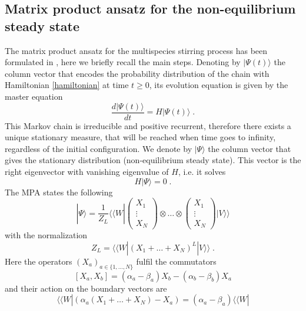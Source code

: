 \documentclass[10pt]{article}
\numberwithin{equation}{section}
\numberwithin{equation}{subsection}
\newcommand{\co}{\;,}
\newcommand{\dt}{\;.}
\begin{document}
\subsection{Matrix product ansatz for the non-equilibrium steady state}
The matrix product ansatz for the multispecies stirring process has been formulated in \cite{vanicat2017exact}, here we briefly recall the main steps.
 Denoting by $|\Psi(t)\rangle$ the column vector that encodes the probability distribution of the chain with Hamiltonian \eqref{hamiltonian} at time $t\geq 0$, its evolution equation is given by 
 the master equation
\begin{equation}
    \frac{d|{\Psi}(t)\rangle}{dt}=H|{\Psi}(t)\rangle\dt
\end{equation}
This Markov chain is irreducible and positive recurrent, therefore there exists a unique stationary measure, that will be reached when time goes to infinity, regardless of the initial configuration. 
We denote by $|\Psi\rangle$ the column vector that gives the stationary distribution (non-equilibrium steady state). This vector is the right eigenvector with vanishing eigenvalue of $H$, i.e. it solves 
\begin{equation}\label{definition-SteadyStateH}
	H|\Psi\rangle =0\dt
\end{equation}
The MPA states the following
\begin{equation}
	|\Psi\rangle=\frac{1}{Z_{L}} \langle \langle W|  \begin{pmatrix}
		X_{1}\\
		\vdots\\
		X_{N}
	\end{pmatrix}\otimes \ldots\otimes \begin{pmatrix}
		X_{1}\\
		\vdots\\
		X_{N}
	\end{pmatrix} |V\rangle\rangle 
\end{equation}
with the normalization 
\begin{equation}
	Z_{L}= \langle \langle W|  (X_{1}+\ldots +X_{N})^{L} |V\rangle\rangle \dt
\end{equation}
Here the operators $(X_{a})_{a\in \{1,\ldots,N\}}$ fulfil the commutators
\begin{equation}\label{bulk}
	\left[X_{a},X_{b}\right]=(\alpha_{a}-\beta_{a})X_{b}-(\alpha_{b}-\beta_{b})X_{a}%
\end{equation}
and their action on the boundary vectors are
\begin{equation}\label{leftBoundary}
	 \langle \langle W|  \left(\alpha_{a}(X_{1}+\ldots+X_{N})-X_{a}\right)=(\alpha_{a}-\beta_{a}) \langle \langle W|  %
\end{equation}
\end{document}
